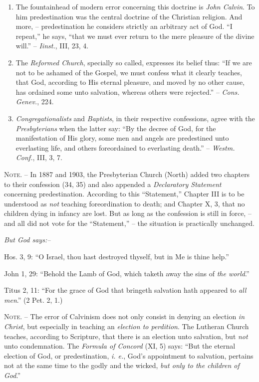 \documentclass[
]{book}
\begin{document}
\begin{enumerate}
\def\labelenumi{\arabic{enumi}.}
\item
  The fountainhead of modern error concerning this doctrine is \emph{John Calvin}. To him predestination was the central doctrine of the Christian religion. And more, -- predestination he considers strictly an arbitrary act of God. ``I repeat,'' he says, ``that we must ever return to the mere pleasure of the divine will.'' -- \emph{Iinst.}, III, 23, 4.
\item
  The \emph{Reformed Church}, specially so called, expresses its belief thus: ``If we are not to be ashamed of the Gospel, we must confess what it clearly teaches, that God, according to His eternal pleasure, and moved by no other cause, has ordained some unto salvation, whereas others were rejected.'' -- \emph{Cons. Genev.}, 224.
\item
  \emph{Congregationalists} and \emph{Baptists}, in their respective confessions, agree with the \emph{Presbyterians} when the latter say: ``By the decree of God, for the manifestation of His glory, some men and angels are predestined unto everlasting life, and others foreordained to everlasting death.'' -- \emph{Westm. Conf.}, III, 3, 7.
\end{enumerate}

\textsc{Note.} -- In 1887 and 1903, the Presbyterian Church (North) added two chapters to their confession (34, 35) and also appended a \emph{Declaratory Statement} concerning predestination. According to this ``Statement,'' Chapter III is to be understood as \emph{not} teaching foreordination to death; and Chapter X, 3, that no children dying in infancy are lost. But as long as the confession is still in force, -- and all did not vote for the ``Statement,'' -- the situation is practically unchanged.

\begin{center}
\textsl{But God says:--}
\end{center}

Hos. 3, 9: ``O Israel, thou hast destroyed thyself, but in Me is thine help.''

John 1, 29: ``Behold the Lamb of God, which taketh away the sins of \emph{the world}.''

Titus 2, 11: ``For the grace of God that bringeth salvation hath appeared to \emph{all men}.'' (2 Pet. 2, 1.)

\textsc{Note.} -- The error of Calvinism does not only consist in denying an election \emph{in Christ}, but especially in teaching an \emph{election to perdition}. The Lutheran Church teaches, according to Scripture, that there is an election unto salvation, but \emph{not} unto condemnation. The \emph{Formula of Concord} (XI, 5) says: ``But the eternal election of God, or predestination, \emph{i. e.}, God's appointment to salvation, pertains not at the same time to the godly and the wicked, \emph{but only to the children of God}.''
\end{document}
